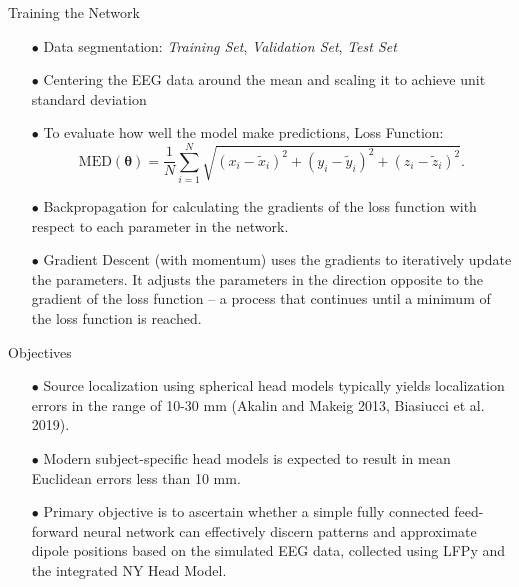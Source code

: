 \documentclass[aspectratio=169, 9pt]{beamer}
\begin{document}
\begin{frame}{Training the Network}
    \begin{itemize}
      \item[$\bullet$] Data segmentation: \emph{Training Set}, \emph{Validation Set}, \emph{Test Set}
      \item[$\bullet$] Centering the EEG data around the mean and scaling it to achieve unit standard deviation
      \item[$\bullet$] To evaluate how well the model make predictions, Loss Function:
      \begin{equation}
        \text{MED}(\boldsymbol{\theta})
          = \frac{1}{N} \sum_{i=1}^{N}
              \sqrt{(x_i - \tilde{x}_i)^2 + (y_i - \tilde{y}_i)^2 + (z_i - \tilde{z}_i)^2}.
      \end{equation}
      \item[$\bullet$] Backpropagation for calculating the gradients of the loss function with respect to each parameter in the network.
      \item[$\bullet$] Gradient Descent (with momentum) uses the gradients to iteratively update the parameters. It adjusts the parameters in the direction opposite to the gradient of the loss function -- a process that continues until a minimum of the loss function is reached.
    \end{itemize}
\end{frame}

\begin{frame}{Objectives}
    \begin{itemize}
      \item[$\bullet$] Source localization using spherical head models typically yields localization errors in the range of 10-30 mm (Akalin and Makeig 2013, Biasiucci et al. 2019).
      \item[$\bullet$] Modern subject-specific head models is expected to result in mean Euclidean errors less than 10 mm.
      \item[$\bullet$] Primary objective is to ascertain whether a simple fully connected feed-forward neural network can effectively discern patterns and approximate dipole positions based on the simulated EEG data, collected using LFPy and the integrated NY Head Model.
    \end{itemize}
\end{frame}
\end{document}
